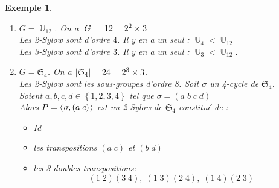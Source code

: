 \documentclass[a4paper, oneside]{report}
\theoremstyle{break}
\newtheorem{exemple}[thm]{Exemple}
\newcommand{\sg}{sous-groupe }
\newcommand{\x}{\times}
\DeclareMathOperator{\U}{\mathbb{U}}
\DeclareMathOperator{\A}{\mathcal{A}}
\DeclarePairedDelimiter\ens{\left\{ }{\right\} }%
\DeclarePairedDelimiter\abs{\lvert}{\rvert}%
\renewcommand{\ens}[1]{\left\{ #1 \right\} }%
\newcommand{\pro}[1]{\langle\hspace{0.1em}#1\hspace{0.1em}\rangle}
\begin{document}
\begin{exemple}
\begin{enumerate}
\begin{center}
\end{center}

$\abs{\A_4} = 12 = 4 \x 3$ et $V=\{e,(1~2)(3~4),(1~3)(2~4), (1~4)(2~3)\}$.
$\A_4$ admet $V$ pour unique 2-Sylow (on l'appelle le \sg de Klein $V$). Il est distingué.\\
$\A_4$ admet quatre 3-Sylow	$\pro{(1 \; 2 \; 3)}, \; \pro{(1 \; 2 \; 4)}, \; \pro{(1 \; 3 \; 4)}, \; \pro{(2 \; 3 \; 4)}$. Ils sont tous conjugués.\\

\item $G = \U_{12}$. On a $\abs{G} = 12 = 2^2 \x 3$\\
Les 2-Sylow sont d'ordre $4$. Il y en a un seul : $\U_4 < \U_{12}$\\
Les 3-Sylow sont d'ordre $3$. Il y en a un seul : $\U_3 < \U_{12}$.\\

\item $G = \mathfrak{S}_4$. On a $\abs{\mathfrak{S}_4} = 24 = 2^3 \x 3$.\\
Les 2-Sylow sont les sous-groupes d'ordre 8. Soit $\sigma$ un 4-cycle de $\mathfrak{S}_4$.\\
Soient $a, b, c, d \in \ens{1, 2, 3, 4}$ tel que $\sigma = (a \; b \; c \; d)$\\
Alors $P=\pro{\sigma, (a \; c)}$ est un 2-Sylow de $\mathfrak{S}_4$ constitué de :
\begin{itemize}
\item Id

\item les transpositions $(a \; c)$ et $(b \; d)$

\item les 3 doubles transpositions:
\[
(1 \; 2)(3 \; 4), \; (1 \; 3)(2 \; 4), \; (1 \; 4)(2 \; 3)
\]


\end{itemize}
\end{enumerate}
\end{exemple}
\end{document}
